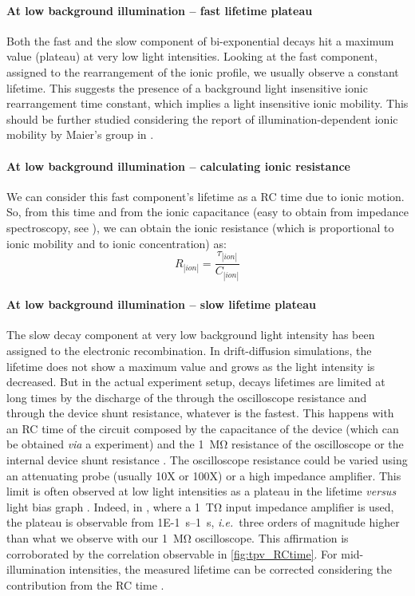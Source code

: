 		\paragraph{At low background illumination -- fast lifetime plateau}
		Both the fast and the slow component of bi\hyp{}exponential decays hit a maximum value (plateau) at very low light intensities.
		Looking at the fast component, assigned to the rearrangement of the ionic profile, we usually observe a constant lifetime.
		This suggests the presence of a background light insensitive ionic rearrangement time constant, which implies a light insensitive ionic mobility.
		This should be further studied considering the report of illumination-dependent ionic mobility by Maier's group in .
		
		\paragraph{At low background illumination -- calculating ionic resistance}
		We can consider this fast component's lifetime as a RC time due to ionic motion.
		So, from this time and from the ionic capacitance (easy to obtain from impedance spectroscopy, see ), we can obtain the ionic resistance (which is proportional to ionic mobility and to ionic concentration) as:
		\begin{equation}
			R_|ion| = \frac{\tau_|ion|}{C_|ion|}
		\end{equation}

		\paragraph{At low background illumination -- slow lifetime plateau}
		The slow decay component at very low background light intensity has been assigned to the electronic recombination.
		In drift-diffusion simulations, the lifetime does not show a maximum value and grows as the light intensity is decreased.
		But in the actual experiment setup, decays lifetimes are limited at long times by the discharge of the through the oscilloscope resistance and through the device shunt resistance, whatever is the fastest.
		This happens with an RC time of the circuit composed by the capacitance of the device (which can be obtained \textsl{via} a  experiment) and the \SI{1}{\Mohm} resistance of the oscilloscope or the internal device shunt resistance \cite{Tvingstedt2017}.
		The oscilloscope resistance could be varied using an attenuating probe (usually 10X or 100X) or a high impedance amplifier.
		This limit is often observed at low light intensities as a plateau in the  lifetime \textsl{versus} light bias graph \cite{Tvingstedt2017}.
		Indeed, in , where a \SI{1}{\tera\ohm} input impedance amplifier is used, the plateau is observable from \SIrange{1E-1}{1}{\s}, \textsl{i.e.}\ three orders of magnitude higher than what we observe with our \SI{1}{\Mohm} oscilloscope.
		This affirmation is corroborated by the correlation observable in \cref{fig:tpv_RCtime}.
		For mid-illumination intensities, the measured lifetime can be corrected considering the contribution from the RC time \cite{Credgington2014}.

